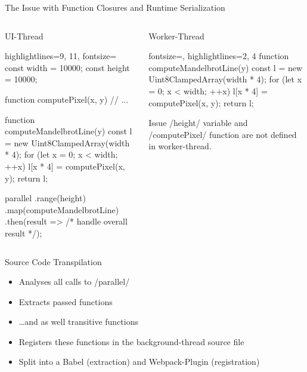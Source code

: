 \begin{frame}{The Issue with Function Closures and Runtime Serialization}
	\begin{columns}[t]
	\begin{column}{0.5\textwidth}
		\begin{block}{UI-Thread}
		\begin{javascriptcode*}{highlightlines={9, 11}, fontsize=\tiny}
const width = 10000;
const height = 10000;

function computePixel(x, y) {
	// ...
}

function computeMandelbrotLine(y) {
	const l = new Uint8ClampedArray(width * 4);
	for (let x = 0; x < width; ++x) {
		l[x * 4] = computePixel(x, y);
	}
	return l;
}

parallel
	.range(height) 
	.map(computeMandelbrotLine)	 
	.then(result => /* handle overall result */);
	\end{javascriptcode*}
	\end{block}
	\end{column}
	\pause
	\begin{column}{0.5\textwidth}
		\begin{block}{Worker-Thread}
			\begin{javascriptcode*}{fontsize=\tiny, highlightlines={2, 4}}
function computeMandelbrotLine(y) {
	const l = new Uint8ClampedArray(width * 4);
	for (let x = 0; x < width; ++x) {
		l[x * 4] = computePixel(x, y);
	}
	return l;
}	
			\end{javascriptcode*}

		\end{block}
		
		\begin{alertblock}{Issue}
			\javascriptinline/height/ variable and \javascriptinline/computePixel/ function are not defined in worker-thread.
		\end{alertblock}
	\end{column}
\end{columns}
\end{frame}

\begin{frame}{Source Code Transpilation}
	\begin{itemize}
		\item Analyses all calls to \javascriptinline/parallel/
		\item Extracts passed functions 
		\item \dots and as well transitive functions
		\item Registers these functions in the background-thread source file
		\item Split into a Babel (extraction) and Webpack-Plugin (registration)
	\end{itemize}
\end{frame}

